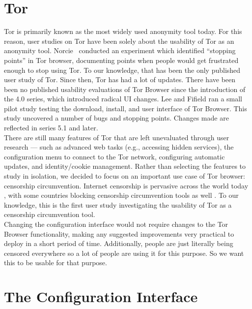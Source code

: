 \documentclass{template}
\begin{document}
\section{Tor}
Tor is primarily known as the most widely used anonymity tool today. 
For this reason, user studies on Tor have been solely about the usability of Tor as an
anonymity tool. Norcie~\cite{norcie2012eliminating} conducted an experiment which identified 
``stopping points'' in Tor browser,  documenting points when people would get frustrated enough 
to stop using Tor. To our knowledge, that has been the only published user study of Tor. 
Since then, Tor has had a lot of updates. There have been been no published usability evaluations of
Tor Browser since the introduction of the 4.0 series, which introduced radical UI changes. 
Lee and Fifield \cite {uxsprint} ran a small pilot study testing the download, install, and user interface of Tor Browser. 
This study uncovered a number of bugs and stopping points. Changes made are reflected in series 
5.1 and later. \\

There are still many features of Tor that are left unevaluated through user
research --- such as advanced web tasks (e.g., accessing hidden services), the
configuration menu to connect to the Tor network, configuring automatic
updates, and identity/cookie management. Rather than selecting the features to
study in isolation,
we decided to focus on an important use case of Tor browser: censorship circumvention. 
Internet censorship is pervasive across the world today \cite{faris2008measuring}, with 
some countries blocking censorship circumvention tools as well \cite{winter2012great}. 
To our knowledge, this is the first user study investigating the usability of Tor as a 
censorship circumvention tool.\\

Changing the configuration interface would not require changes to the 
Tor Browser functionality, making any suggested improvements very practical to 
deploy in a short period of time. {\color {red} Additionally, people are just literally
being censored everywhere so a lot of people are using it for this purpose. So 
we want this to be usable for that purpose.} 

\section{The Configuration Interface}
\end{document}
